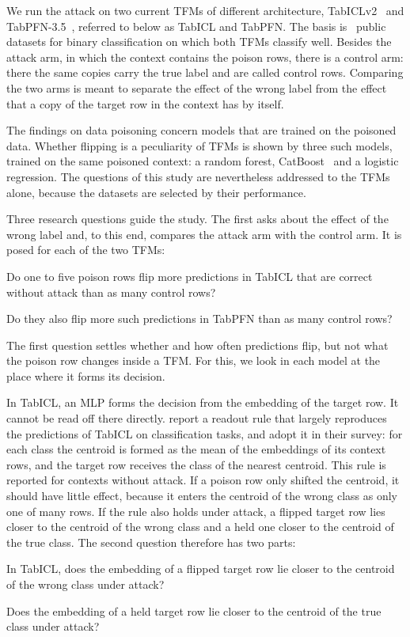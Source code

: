 \documentclass[pdflatex,sn-mathphys-num]{sn-jnl}
\newenvironment{fragen}{\begin{list}{}{\settowidth{\labelwidth}{(1a)}%
  \setlength{\leftmargin}{\dimexpr\labelwidth+\labelsep\relax}%
  \setlength{\itemsep}{1pt}\setlength{\topsep}{3pt}}}{\end{list}}
\begin{document}
We run the attack on two current TFMs of different architecture,
TabICLv2~\citep{qu2026} and TabPFN-3.5~\citep{jaeger2026}, referred to
below as TabICL and TabPFN. The basis is \zDS\ public datasets for
binary classification on which both TFMs classify well. Besides the
attack arm, in which the context contains the poison rows, there is a
control arm: there the same copies carry the true label and are called
control rows. Comparing the two arms is meant to separate the effect of
the wrong label from the effect that a copy of the target row in the
context has by itself.

The findings on data poisoning concern models that are trained
on the poisoned data. Whether flipping is a peculiarity of TFMs is shown
by three such models, trained on the same poisoned context: a random
forest, CatBoost~\citep{prokhorenkova2018} and a logistic regression.
The questions of this study are nevertheless addressed to the TFMs
alone, because the datasets are selected by their performance.

Three research questions guide the study. The first asks about the
effect of the wrong label and, to this end, compares the attack arm with
the control arm. It is posed for each of the two TFMs:
\begin{fragen}
\item[(1a)] Do one to five poison rows flip more predictions in TabICL
that are correct without attack than as many control rows?
\item[(1b)] Do they also flip more such predictions in TabPFN than as
many control rows?
\end{fragen}

The first question settles whether and how often predictions flip, but
not what the poison row changes inside a TFM. For this, we look in each
model at the place where it forms its decision.

In TabICL, an MLP forms the decision from the embedding of the target
row. It cannot be read off there directly. \citet{bilos2026} report a
readout rule that largely reproduces the predictions of TabICL on
classification tasks, and \citet{kurashkin2026} adopt it in their survey:
for each class the centroid is formed as the mean of the embeddings of
its context rows, and the target row receives the class of the nearest
centroid. This rule is
reported for contexts without attack. If a poison row only shifted the
centroid, it should have little effect, because it enters the centroid
of the wrong class as only one of many rows. If the rule also holds
under attack, a flipped target row lies closer to the centroid of the
wrong class and a held one closer to the centroid of the true class. The
second question therefore has two parts:
\begin{fragen}
\item[(2a)] In TabICL, does the embedding of a flipped target row lie
closer to the centroid of the wrong class under attack?
\item[(2b)] Does the embedding of a held target row lie closer to the
centroid of the true class under attack?
\end{fragen}
\end{document}
